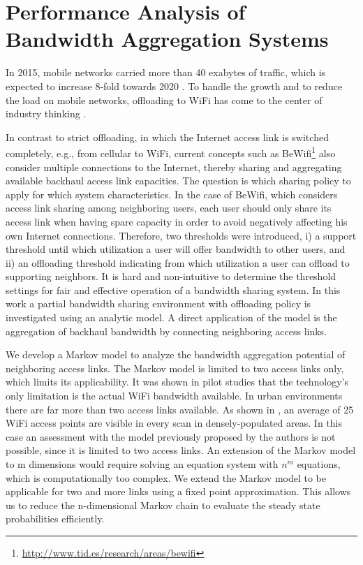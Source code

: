 \chapter{Performance Analysis of Bandwidth Aggregation Systems}\label{chap:aggregation}

In 2015, mobile networks carried more than 40 exabytes of traffic, which is expected to increase 8-fold towards 2020 \cite{cisco2016mobile}.
To handle the growth and to reduce the load on mobile networks, offloading to WiFi has come to the center of industry thinking \cite{wba2011wifi}.

In contrast to strict offloading, in which the Internet access link is switched completely, e.g., from cellular to WiFi, current concepts such as BeWifi\footnote{\url{http://www.tid.es/research/areas/bewifi}} also consider multiple connections to the Internet, thereby sharing and aggregating available backhaul access link capacities. The question is which sharing policy to apply for which system characteristics. In the case of BeWifi, which considers access link sharing among neighboring users, each user should only share its access link when having spare capacity in order to avoid negatively affecting his own Internet connections. Therefore, two thresholds were introduced, i) a support threshold until which utilization a user will offer bandwidth to other users, and ii) an offloading threshold indicating from which utilization a user can offload to supporting neighbors.
It is hard and non-intuitive to determine the threshold settings for fair and effective operation of a bandwidth sharing system.
In this work a partial bandwidth sharing environment with offloading policy is investigated using an analytic model.
A direct application of the model is the aggregation of backhaul bandwidth by connecting neighboring access links.

We develop a Markov model to analyze the bandwidth aggregation potential of neighboring access links.
The Markov model is limited to two access links only, which limits its applicability.
It was shown in pilot studies that the technology's only limitation is the actual WiFi bandwidth available.
In urban environments there are far more than two access links available.
As shown in \cite{sapiezynski2015tracking}, an average of 25 WiFi access points are visible in every scan in densely-populated areas.
In this case an assessment with the model previously proposed by the authors is not possible, since it is limited to two access links.
An extension of the Markov model to m dimensions would require solving an equation system with $n^m$ equations, which is computationally too complex.
We extend the Markov model to be applicable for two and more links using a fixed point approximation.
This allows us to reduce the n-dimensional Markov chain to evaluate the steady state probabilities efficiently.

